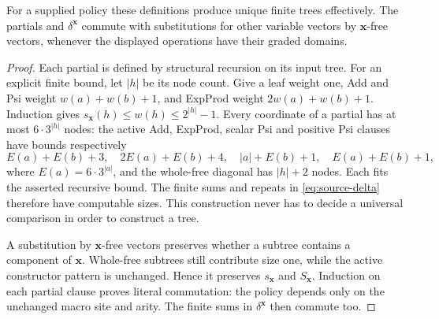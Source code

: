 \begin{lemma}
\label{lem:source-finiteness}
For a supplied policy these definitions produce unique finite trees
effectively.  The partials and $\delta^{\mathbf x}$ commute with
substitutions for other variable vectors by $\mathbf x$-free vectors,
whenever the displayed operations have their graded domains.
\end{lemma}
\begin{proof}
Each partial is defined by structural recursion on its input tree.
For an explicit finite bound, let $|h|$ be its node count.  Give a leaf
weight one, Add and Psi weight $w(a)+w(b)+1$, and ExpProd weight
$2w(a)+w(b)+1$.  Induction gives
$s_{\mathbf x}(h)\le w(h)\le2^{|h|}-1$.
Every coordinate of a partial has at most $6\cdot3^{|h|}$ nodes:
the active Add, ExpProd, scalar Psi and positive Psi clauses have
bounds respectively
\[
 E(a)+E(b)+3,\quad2E(a)+E(b)+4,\quad
 |a|+E(b)+1,\quad E(a)+E(b)+1,
\]
where $E(a)=6\cdot3^{|a|}$, and the whole-free diagonal has
$|h|+2$ nodes.  Each fits the asserted recursive bound.
The finite sums and repeats in \eqref{eq:source-delta} therefore
have computable sizes.  This construction never has to decide a
universal comparison in order to construct a tree.

A substitution by $\mathbf x$-free vectors preserves whether a
subtree contains a component of $\mathbf x$.  Whole-free subtrees
still contribute size one, while the active constructor pattern is
unchanged.  Hence it preserves $s_{\mathbf x}$ and
$S_{\mathbf x}$.  Induction on each partial clause proves literal
commutation: the policy depends only on the unchanged macro site and
arity.  The finite sums in $\delta^{\mathbf x}$ then commute too.
\end{proof}

